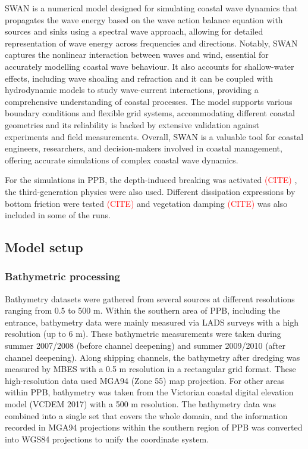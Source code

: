 \documentclass[12pt]{article}
\newcommand{\tocite}{\textcolor{red}{(CITE) }}
\begin{document}
SWAN is a numerical model designed for simulating coastal wave dynamics that propagates the wave energy based on the wave action balance equation with sources and sinks using a spectral wave approach, allowing for detailed representation of wave energy across frequencies and directions. Notably, SWAN captures the nonlinear interaction between waves and wind, essential for accurately modelling coastal wave behaviour. It also accounts for shallow-water effects, including wave shoaling and refraction and it can be coupled with hydrodynamic models to study wave-current interactions, providing a comprehensive understanding of coastal processes. The model supports various boundary conditions and flexible grid systems, accommodating different coastal geometries and its reliability is backed by extensive validation against experiments and field measurements. Overall, SWAN is a valuable tool for coastal engineers, researchers, and decision-makers involved in coastal management, offering accurate simulations of complex coastal wave dynamics.

For the simulations in PPB, the depth-induced breaking was activated \tocite, the third-generation physics were also used. Different dissipation expressions by bottom friction were tested \tocite and vegetation damping \tocite was also included in some of the runs.

\subsection{Model setup} \label{sec:model_setup}

\subsubsection{Bathymetric processing}

Bathymetry datasets were gathered from several sources at different resolutions ranging from 0.5 to 500 m. Within the southern area of PPB, including the entrance, bathymetry data were mainly measured via LADS surveys with a high resolution (up to 6 m). These bathymetric measurements were taken during summer 2007/2008 (before channel deepening) and summer 2009/2010 (after channel deepening). Along shipping channels, the bathymetry after dredging was measured by MBES with a 0.5 m resolution in a rectangular grid format. These high-resolution data used MGA94 (Zone 55) map projection. For other areas within PPB, bathymetry was taken from the Victorian coastal digital elevation model (VCDEM 2017) with a 500 m resolution. The bathymetry data was combined into a single set that covers the whole domain, and the information recorded in MGA94 projections within the southern region of PPB was converted into WGS84 projections to unify the coordinate system.
\end{document}
